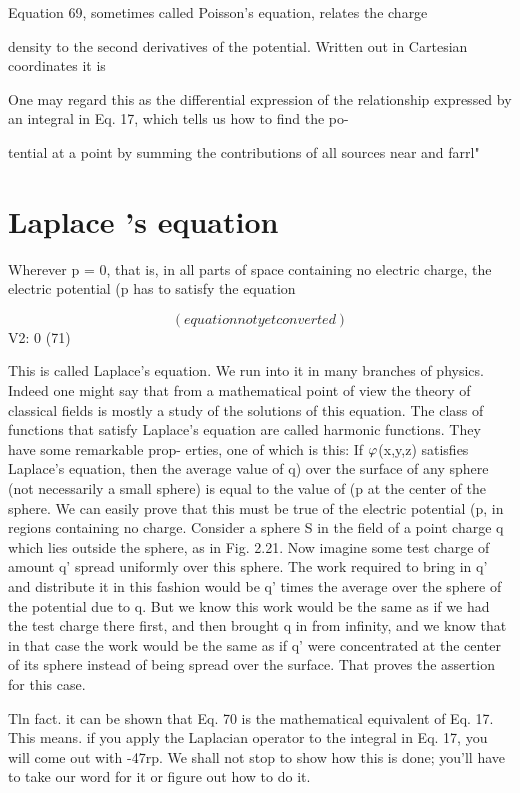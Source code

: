 Equation 69, sometimes called Poisson's equation, relates the charge

density to the second derivatives of the potential. Written out in
Cartesian coordinates it is

One may regard this as the differential expression of the relationship
expressed by an integral in Eq. 17, which tells us how to find the po-

tential at a point by summing the contributions of all sources near
and farrl"

\section{Laplace 's equation}

Wherever p = 0, that is, in all parts of space containing no electric
charge, the electric potential (p has to satisfy the equation

\begin{equation}
(equation not yet converted)
\end{equation}
V2\pot: 0 (71)

This is called Laplace's equation. We run into it in many branches
of physics. Indeed one might say that from a mathematical point of
view the theory of classical fields is mostly a study of the solutions of
this equation. The class of functions that satisfy Laplace's equation
are called harmonic functions. They have some remarkable prop-
erties, one of which is this: If $\varphi$(x,y,z) satisfies Laplace's equation,
then the average value of q) over the surface of any sphere (not necessarily
a small sphere) is equal to the value of (p at the center of the
sphere. We can easily prove that this must be true of the electric
potential (p, in regions containing no charge. Consider a sphere S
in the field of a point charge q which lies outside the sphere, as in
Fig. 2.21. Now imagine some test charge of amount q' spread uniformly
over this sphere. The work required to bring in q' and distribute
it in this fashion would be q' times the average over the sphere
of the potential due to q. But we know this work would be the same
as if we had the test charge there first, and then brought q in from
infinity, and we know that in that case the work would be the same as
if q' were concentrated at the center of its sphere instead of being
spread over the surface. That proves the assertion for this case.

Tln fact. it can be shown that Eq. 70 is the mathematical equivalent of Eq. 17. This
means. if you apply the Laplacian operator to the integral in Eq. 17, you will come
out with -47rp. We shall not stop to show how this is done; you'll have to take our
word for it or figure out how to do it.

